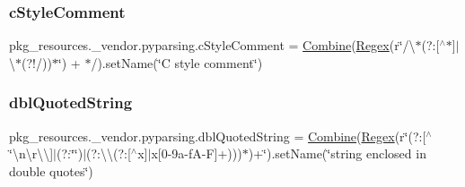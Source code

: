 \mbox{\label{namespacepkg__resources_1_1__vendor_1_1pyparsing_a74086d89897152955bf3ceb8a2957839}} 
\subsubsection{\texorpdfstring{c\+Style\+Comment}{cStyleComment}}
{\footnotesize\ttfamily pkg\+\_\+resources.\+\_\+vendor.\+pyparsing.\+c\+Style\+Comment = \hyperlink{classpkg__resources_1_1__vendor_1_1pyparsing_1_1_combine}{Combine}(\hyperlink{classpkg__resources_1_1__vendor_1_1pyparsing_1_1_regex}{Regex}(r\char`\"{}/\textbackslash{}$\ast$(?\+:\mbox{[}$^\wedge$$\ast$\mbox{]}$\vert$\textbackslash{}$\ast$(?!/))$\ast$\char`\"{}) + \textquotesingle{}$\ast$/\textquotesingle{}).set\+Name(\char`\"{}C style comment\char`\"{})}

\mbox{\label{namespacepkg__resources_1_1__vendor_1_1pyparsing_aa66de23ed2a70e4bf70044b2b3bcb66d}} 
\subsubsection{\texorpdfstring{dbl\+Quoted\+String}{dblQuotedString}}
{\footnotesize\ttfamily pkg\+\_\+resources.\+\_\+vendor.\+pyparsing.\+dbl\+Quoted\+String = \hyperlink{classpkg__resources_1_1__vendor_1_1pyparsing_1_1_combine}{Combine}(\hyperlink{classpkg__resources_1_1__vendor_1_1pyparsing_1_1_regex}{Regex}(r\textquotesingle{}\char`\"{}(?\+:\mbox{[}$^\wedge$\char`\"{}\textbackslash{}n\textbackslash{}r\textbackslash{}\textbackslash{}\mbox{]}$\vert$(?\+:\char`\"{}\char`\"{})$\vert$(?\+:\textbackslash{}\textbackslash{}(?\+:\mbox{[}$^\wedge$x\mbox{]}$\vert$x\mbox{[}0-\/9a-\/f\+A-\/\+F\mbox{]}+)))$\ast$\textquotesingle{})+\textquotesingle{}\char`\"{}\textquotesingle{}).\+set\+Name(\char`\"{}string enclosed in double quotes\char`\"{})}

